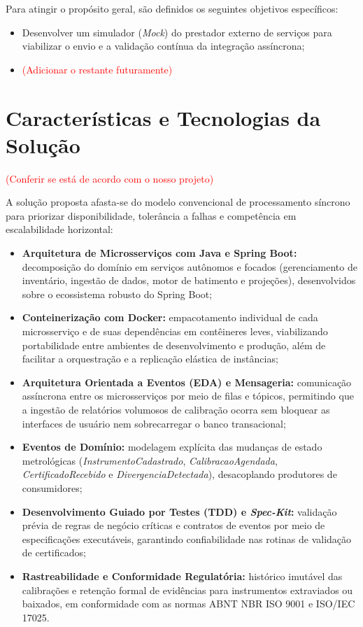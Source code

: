 Para atingir o propósito geral, são definidos os seguintes objetivos específicos:

\begin{itemize}
    \item Desenvolver um simulador (\textit{Mock}) do prestador externo de serviços para viabilizar o envio e a validação contínua da integração assíncrona;
    \item \textcolor{red}{(Adicionar o restante futuramente)}
\end{itemize}

\section{Características e Tecnologias da Solução}

\textcolor{red}{(Conferir se está de acordo com o nosso projeto)}

A solução proposta afasta-se do modelo convencional de processamento síncrono para priorizar disponibilidade, tolerância a falhas e competência em escalabilidade horizontal:

\begin{itemize}
    \item \textbf{Arquitetura de Microsserviços com Java e Spring Boot:} decomposição do domínio em serviços autônomos e focados (gerenciamento de inventário, ingestão de dados, motor de batimento e projeções), desenvolvidos sobre o ecossistema robusto do Spring Boot;
    \item \textbf{Conteinerização com Docker:} empacotamento individual de cada microsserviço e de suas dependências em contêineres leves, viabilizando portabilidade entre ambientes de desenvolvimento e produção, além de facilitar a orquestração e a replicação elástica de instâncias;
    \item \textbf{Arquitetura Orientada a Eventos (EDA) e Mensageria:} comunicação assíncrona entre os microsserviços por meio de filas e tópicos, permitindo que a ingestão de relatórios volumosos de calibração ocorra sem bloquear as interfaces de usuário nem sobrecarregar o banco transacional;
    \item \textbf{Eventos de Domínio:} modelagem explícita das mudanças de estado metrológicas (\textit{InstrumentoCadastrado}, \textit{CalibracaoAgendada}, \textit{CertificadoRecebido} e \textit{DivergenciaDetectada}), desacoplando produtores de consumidores;
    \item \textbf{Desenvolvimento Guiado por Testes (TDD) e \textit{Spec-Kit}:} validação prévia de regras de negócio críticas e contratos de eventos por meio de especificações executáveis, garantindo confiabilidade nas rotinas de validação de certificados;
    \item \textbf{Rastreabilidade e Conformidade Regulatória:} histórico imutável das calibrações e retenção formal de evidências para instrumentos extraviados ou baixados, em conformidade com as normas ABNT NBR ISO 9001 e ISO/IEC 17025.
\end{itemize}

